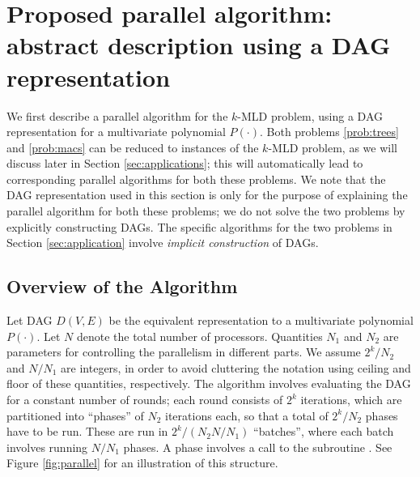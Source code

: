 
\section{Proposed parallel algorithm: abstract description using a DAG representation}
\label{sec:proposed}
We first describe a parallel algorithm for the $k$-MLD problem, using a DAG representation
for a multivariate polynomial $P(\cdot)$.  
Both problems \ref{prob:trees} and \ref{prob:macs} can be reduced to instances
of the $k$-MLD problem, as we will discuss later in Section \ref{sec:applications};
this will automatically lead to corresponding parallel algorithms for both these problems.
We note that the DAG representation used in this section
is only for the purpose of explaining the parallel algorithm for both these problems; we do not
solve the two problems by explicitly constructing DAGs. The specific algorithms
for the two problems in Section \ref{sec:application} involve \emph{implicit construction} of DAGs.


\subsection{Overview of the Algorithm \parmaxwt{}}
Let DAG $D(V,E)$ be the equivalent representation to a multivariate polynomial $P(\cdot)$.
Let $N$ denote the total number of
processors. Quantities $N_1$ and $N_2$ are parameters for controlling the parallelism
in different parts.  
We assume $2^k/N_2$ and $N/N_1$ are integers, in order to avoid cluttering the
notation using ceiling and floor of these quantities, respectively.
The algorithm involves evaluating the
DAG for a constant number of rounds; each round consists of
$2^k$ iterations, which are partitioned into ``phases'' of $N_2$ iterations each,
so that a total of $2^k/N_2$ phases have to be run. These are run in $2^k/(N_2N/N_1)$ ``batches'',
where each batch involves running $N/N_1$ phases. A phase involves a call to the subroutine \parcircuit{}.
See Figure \ref{fig:parallel} for an illustration of this structure.


